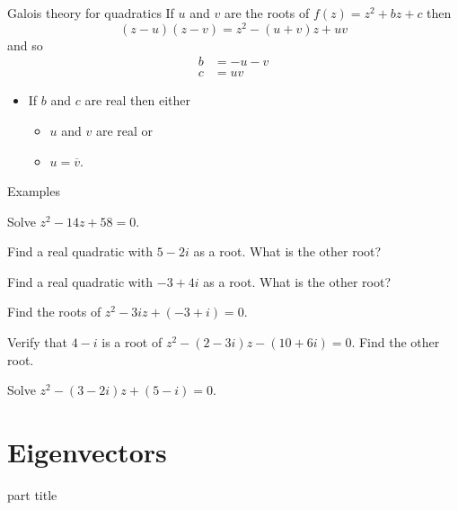 \documentclass{beamer}
\begin{document}
\begin{frame}{Galois theory for quadratics}
If $u$ and $v$ are the roots of $f(z) = z^2 + bz+c$ then
\begin{equation*}
(z-u)(z-v) = z^2 - (u+v)z + uv
\end{equation*}
and so
\begin{align*}
b & = -u-v\\
c & = uv
\end{align*}
\begin{itemize}
	\item If $b$ and $c$ are real then either
	\begin{itemize}
		\item $u$ and $v$ are real or
		\item $u = \overline{v}$.
	\end{itemize}
\end{itemize}
\end{frame}

\begin{frame}{Examples}
\begin{example}
Solve $z^2-14z+58 = 0$.
\end{example}
\begin{example}
Find a real quadratic with $5-2i$ as a root. What is the other root?
\end{example}
\begin{example}
Find a real quadratic with $-3+4i$ as a root. What is the other root?
\end{example}
\end{frame}

\begin{frame}
\begin{example}
Find the roots of $z^2-3iz+(-3+i) = 0$.
\end{example}
\begin{example}
Verify that $4-i$ is a root of $z^2 - (2-3i)z-(10+6i) = 0$. Find the other root.
\end{example}
\begin{example}
Solve $z^2-(3-2i)z + (5-i) = 0$.
\end{example}
\end{frame}

\section{Eigenvectors}

\begin{frame}
\begin{beamercolorbox}[sep=12pt,center]{part title}
\insertsection\par
\end{beamercolorbox}
\end{frame}
\end{document}
